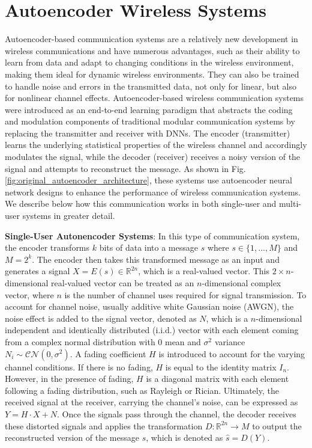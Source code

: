 \section{Autoencoder Wireless Systems}
\label{s:back}

Autoencoder-based communication systems are a relatively new development in wireless communications and have numerous advantages, such as their ability to learn from data and adapt to changing conditions in the wireless environment, making them ideal for dynamic wireless environments. They can also be trained to handle noise and errors in the transmitted data, not only for linear, but also for nonlinear channel effects. Autoencoder-based wireless communication systems were introduced as an end-to-end learning paradigm that abstracts the coding and modulation components of traditional modular communication systems by replacing the transmitter and receiver with DNNs. The encoder (transmitter) learns the underlying statistical properties of the wireless channel and accordingly modulates the signal, while the decoder (receiver) receives a noisy version of the signal and attempts to reconstruct the message. As shown in Fig. \ref{fig:original_autoencoder_architecture}, these systems use autoencoder neural network designs \cite{baldi2012autoencoders} to enhance the performance of wireless communication systems. We describe below how this communication works in both single-user and multi-user systems in greater detail.

\textbf{Single-User Autonencoder Systems}: In this type of communication system, the encoder transforms \(k\) bits of data into a message \(s\) where \(s \in \{1,...,M\}\) and \(M = 2^k\). The encoder then takes this transformed message as an input and generates a signal \(X = E(s) \in \mathbb{R}^{2n}\), which is a real-valued vector. This \(2 \times n\)-dimensional real-valued vector can be treated as an \(n\)-dimensional complex vector, where \(n\) is the number of channel uses required for signal transmission. To account for channel noise, usually additive white Gaussian noise (AWGN), the noise effect is added to the signal vector, denoted as \(N\), which is a \(n\)-dimensional independent and identically distributed (i.i.d.) vector with each element coming from a complex normal distribution with 0 mean and \(\sigma^2\) variance \(N_i \sim \mathcal{CN}(0, \sigma^2)\). A fading coefficient \(H\) is introduced to account for the varying channel conditions. If there is no fading, \(H\) is equal to the identity matrix \(I_n\). However, in the presence of fading, \(H\) is a diagonal matrix with each element following a fading distribution, such as Rayleigh or Rician. Ultimately, the received signal at the receiver, carrying the channel's noise, can be expressed as \(Y = H \cdot X + N\). Once the signals pass through the channel, the decoder receives these distorted signals and applies the transformation \(D: \mathbb{R}^{2n} \rightarrow M \) to output the reconstructed version of the message \(s\), which is  denoted as \(\hat{s} = D(Y)\).

